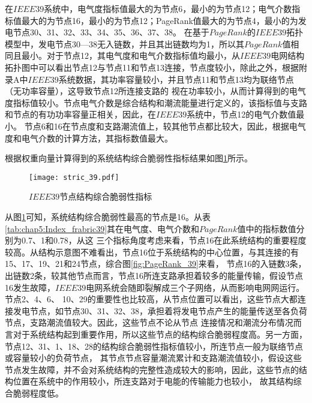 在$IEEE39$系统中，电气度指标值最大的为节点6，最小的为节点12；电气介数指标值最大的为节点16，最小的为节点12；PageRank值最大的为节点4，最小的为发电节点30、31、32、33、34、35、36、37、38。
在基于$PageRank$的$IEEE39$拓扑模型中，发电节点30—38无入链数，并且其出链数均为1，所以其$PageRank$值相同且最小。对于节点12，其电气度和电气介数指标值均最小，从$IEEE39$电网结构
拓扑图中可以看出节点12与节点11和节点13连接，节点度较小，除此之外，根据附录A中$IEEE39$系统数据，其功率容量较小，并且节点11和节点13均为联络节点（无功率容量），这导致节点12所连接支路的
视在功率较小，从而计算得到的电气度指标值较小。节点电气介数是综合结构和潮流能量进行定义的，该指标值与支路和节点的有功功率容量正相关，因此，在$IEEE39$系统中，节点12的电气介数值最小。
节点6和16在节点度和支路潮流值上，较其他节点都比较大，因此，根据电气度和电气介数的计算方法，其指标数值最大。

根据权重向量计算得到的系统结构综合脆弱性指标结果如图\ref{fig:stric_39}所示。
\begin{figure}[H] %
  \centering
  \texttt{[image: stric\_39.pdf]}
  \caption{$IEEE39$节点结构综合脆弱性指标}
  \label{fig:stric_39}
\end{figure}

从图\ref{fig:stric_39}可知，系统结构综合脆弱性最高的节点是16。从表\ref{tab:chap5:Index_frabric39}其在电气度、电气介数和$PageRank$值中的指标数值分别为0.7、1和0.78，从这
三个指标角度考虑来看，节点16在此系统结构的重要程度较高。从结构示意图不难看出，节点16位于系统结构的中心位置，与其连接的有15、17、19、21和24节点，综合图\ref{fig:PageRank_39}来看，
节点16的入链数3条，出链数2条，较其他节点而言，节点16所连支路承担着较多的能量传输，假设节点16发生故障，$IEEE39$电网系统会随即裂解成三个子网络，从而影响电网网运行。节点2、4、6、
10、29的重要性也比较高，从节点位置可以看出，这些节点大都连接发电节点，如节点30、31、32、38，承担着将发电节点产生的能量传送至各负荷节点，支路潮流值较大。因此，这些节点不论从节点
连接情况和潮流分布情况而言对于系统结构起到重要作用，所以这些节点的结构综合脆弱程度高。另一方面，节点12、31、1、18、28的结构综合脆弱性指标值较小，所连节点一般为联络节点或容量较小的负荷节点，
其节点节点容量潮流累计和支路潮流值较小，假设这些节点发生故障，并不会对系统结构的完整性造成较大的影响，因此，这些节点的结构位置在系统中的作用较小，所连支路对于电能的传输能力也较小，
故其结构综合脆弱程度低。

